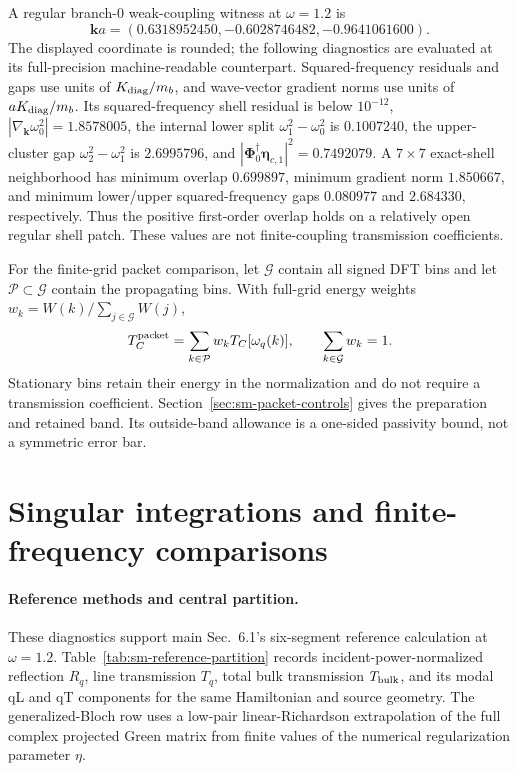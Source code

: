 \documentclass[10pt,aps,onecolumn,notitlepage,nofootinbib]{revtex4-2}
\newcommand{\veta}{\bm\eta}
\begin{document}
A regular branch-0 weak-coupling witness at $\omega=1.2$ is
\begin{equation}
 \bm k a=(0.6318952450,-0.6028746482,-0.9641061600).
\end{equation}
The displayed coordinate is rounded; the following diagnostics are evaluated at its full-precision machine-readable counterpart. Squared-frequency residuals and gaps use units of $K_{\rm diag}/m_b$, and wave-vector gradient norms use units of $aK_{\rm diag}/m_b$. Its squared-frequency shell residual is below $10^{-12}$, $|\nabla_{\bm k}\omega_0^2|=1.8578005$, the internal lower split $\omega_1^2-\omega_0^2$ is $0.1007240$, the upper-cluster gap $\omega_2^2-\omega_1^2$ is $2.6995796$, and $|\bm\Phi_0^\dagger\veta_{c,1}|^2=0.7492079$. A $7\times7$ exact-shell neighborhood has minimum overlap $0.699897$, minimum gradient norm $1.850667$, and minimum lower/upper squared-frequency gaps $0.080977$ and $2.684330$, respectively. Thus the positive first-order overlap holds on a relatively open regular shell patch. These values are not finite-coupling transmission coefficients.

For the finite-grid packet comparison, let $\mathcal G$ contain all signed DFT bins and let $\mathcal P\subset\mathcal G$ contain the propagating bins. With full-grid energy weights $w_k=W(k)/\sum_{j\in\mathcal G}W(j)$,
\begin{equation}
 T_C^{\rm packet}=\sum_{k\in\mathcal P}w_kT_C[\omega_q(k)],
 \qquad \sum_{k\in\mathcal G}w_k=1.
\end{equation}
Stationary bins retain their energy in the normalization and do not require a transmission coefficient. Section~\ref{sec:sm-packet-controls} gives the preparation and retained band. Its outside-band allowance is a one-sided passivity bound, not a symmetric error bar.

\section{Singular integrations and finite-frequency comparisons}

\paragraph*{Reference methods and central partition.}
These diagnostics support main Sec.~6.1's six-segment reference calculation at $\omega=1.2$. Table~\ref{tab:sm-reference-partition} records incident-power-normalized reflection $R_q$, line transmission $T_q$, total bulk transmission $T_{\rm bulk}$, and its modal qL and qT components for the same Hamiltonian and source geometry. The generalized-Bloch row uses a low-pair linear-Richardson extrapolation of the full complex projected Green matrix from finite values of the numerical regularization parameter $\eta$.
\end{document}
